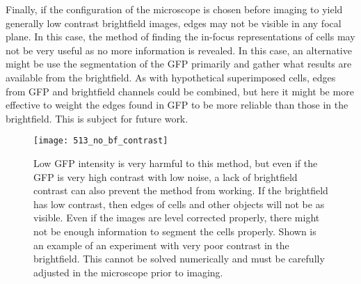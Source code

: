 Finally, if the configuration of the microscope is chosen before imaging to yield generally low contrast brightfield images, edges may not be visible in any focal plane. In this case, the method of finding the in-focus representations of cells may not be very useful as no more information is revealed. In this case, an alternative might be use the segmentation of the GFP primarily and gather what results are available from the brightfield. As with hypothetical superimposed cells, edges from GFP and brightfield channels could be combined, but here it might be more effective to weight the edges found in GFP to be more reliable than those in the brightfield. This is subject for future work.

\begin{figure}[h!]
 \centering
 \texttt{[image: 513\_no\_bf\_contrast]}
 \caption[Lack of brightfield contrast]{
 	Low GFP intensity is very harmful to this method, but even if the GFP is very high contrast with low noise, a lack of brightfield contrast can also prevent the method from working. If the brightfield has low contrast, then edges of cells and other objects will not be as visible. Even if the images are level corrected properly, there might not be enough information to segment the cells properly. Shown is an example of an experiment with very poor contrast in the brightfield. This cannot be solved numerically and must be carefully adjusted in the microscope prior to imaging.
 }
 \label{fig:nobfcontrast}
\end{figure}
